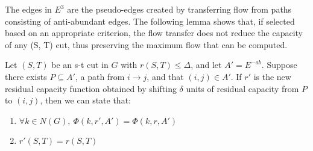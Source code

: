    The edges in $E^3$ are the pseudo-edges created by transferring flow from paths consisting of anti-abundant edges. The following lemma shows that, if selected based on an appropriate criterion, the flow transfer does not reduce the capacity of any (S, T) cut, thus preserving the maximum flow that can be computed.
    \begin{lemma}
        \label{ftsafe}

        Let \((S,T)\) be an s-t cut in \(G\) with \(r(S,T) \leq \Delta\), and let \(A' = E^{-ab}\).  
        Suppose there exists \(P \subseteq A'\), a path from \(i \rightarrow j\), and that \((i,j) \in A'\).  
        If \(r'\) is the new residual capacity function obtained by shifting \(\delta\) units of residual capacity from \(P\) to \((i,j)\), then we can state that:

        \begin{enumerate}
            \item $\forall k\in N(G),\ \Phi(k,r',A') = \Phi(k,r,A') $
            \item $r'(S,T) = r(S,T)$
        \end{enumerate}
        
    \end{lemma}
